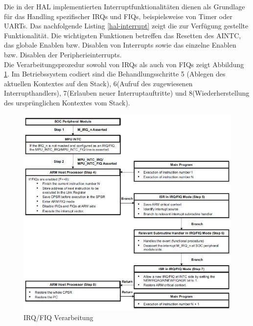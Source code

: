 Die in der HAL implementierten Interruptfunktionalitäten dienen als Grundlage für das Handling spezifischer IRQs und FIQs, beispielsweise von Timer oder UARTs. Das nachfolgende Listing \ref{hal-interrupt} zeigt die zur Verfügung gestellte Funktionalität. Die wichtigsten Funktionen betreffen das Resetten des AINTC, das globale Enablen bzw. Disablen von Interrupts sowie das einzelne Enablen bzw. Disablen der Peripherieinterrupts.\\



Die Verarbeitungsprozedur sowohl von IRQs als auch von FIQs zeigt Abbildung \ref{fig:interruptProcedure}. Im Betriebssystem codiert sind die Behandlungsschritte 5 (Ablegen des aktuellen Kontextes auf den Stack), 6(Aufruf des zugewiesenen Interrupthandlers), 7(Erlauben neuer Interruptauftritte) und 8(Wiederherstellung des ursprünglichen Kontextes vom Stack).\\


\begin{figure}[H]
	\includegraphics[scale=1]{chapters/hal/figures/interruptProcedure}
	\caption{IRQ/FIQ Verarbeitung \cite[S. 193]{ARM:TRM}}
	\label{fig:interruptProcedure}
\end{figure}

\pagebreak 